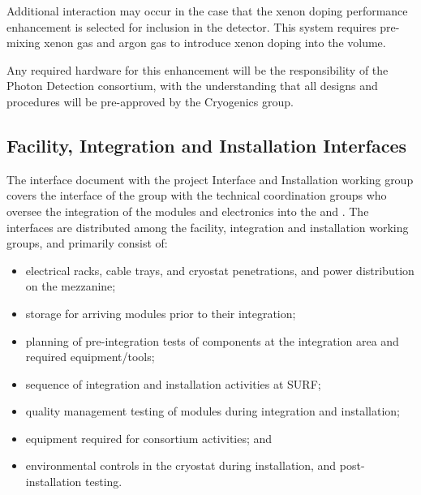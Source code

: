 Additional interaction may occur in the case that the xenon doping performance enhancement is selected for inclusion in the detector.  This system requires pre-mixing xenon gas and argon gas to introduce xenon doping into the \lar volume. 


Any required hardware for this enhancement will be the responsibility of the Photon Detection consortium, with the understanding that all designs and procedures will be pre-approved by the Cryogenics group. 


\subsection{Facility, Integration and Installation Interfaces}

The interface document with the project Interface and Installation working group covers the interface of the  group with the technical coordination groups who oversee the integration of the  modules and electronics into the  and . The interfaces are distributed among the facility, integration and installation working groups, and primarily consist of:
\begin{itemize}
    \item electrical racks, cable trays, and cryostat penetrations, and power distribution on the mezzanine;
    \item storage for arriving  modules prior to their integration;
    \item planning of pre-integration tests of  components at the integration area and required equipment/tools;
    \item sequence of integration and installation activities at SURF;
    \item quality management testing of  modules during integration and installation;
    \item equipment required for  consortium activities; and
    \item environmental controls in the cryostat during installation, and post-installation testing.
\end{itemize}

